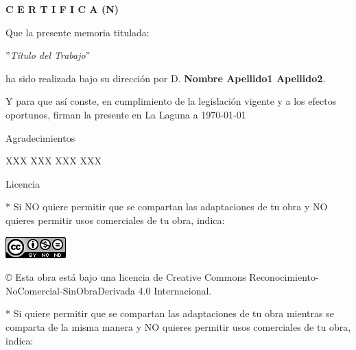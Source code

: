 \documentclass[a4paper,12pt,oneside]{scrbook}
\begin{document}
\bigskip
\bigskip
\textbf{C E R T I F I C A (N)}

\bigskip
\bigskip
Que la presente memoria titulada:

\bigskip
''\textit{Título del Trabajo}''

\bigskip
\bigskip
\bigskip

\noindent ha sido realizada bajo su dirección por D. \textbf{Nombre Apellido1 Apellido2}.

\bigskip
\bigskip

Y para que así conste, en cumplimiento de la legislación vigente y a los efectos
oportunos, firman la presente en La Laguna a \today

\thispagestyle{empty}

{ \flushright

\begin{LARGE}
Agradecimientos
\end{LARGE}

\hspace{3mm}

\begin{large}
XXX
XXX
XXX
XXX
\end{large}

}
\newpage
{}
\thispagestyle{empty}

\bigskip
\begin{LARGE}
Licencia
\end{LARGE}

\bigskip
* Si NO quiere permitir que se compartan las adaptaciones de tu obra y NO quieres permitir usos comerciales de tu obra, indica:

\begin{center}
\includegraphics[scale=1.8]{images/by-nc-nd_88x31}\\[5mm]
\end{center}

\begin{large}
© Esta obra está bajo una licencia de Creative Commons Reconocimiento-NoComercial-SinObraDerivada 4.0 Internacional.
\end{large}

\bigskip
\bigskip
\bigskip
* Si quiere permitir que se compartan las adaptaciones de tu obra mientras se comparta de la misma manera y NO quieres permitir usos comerciales de tu obra, indica:
\end{document}

